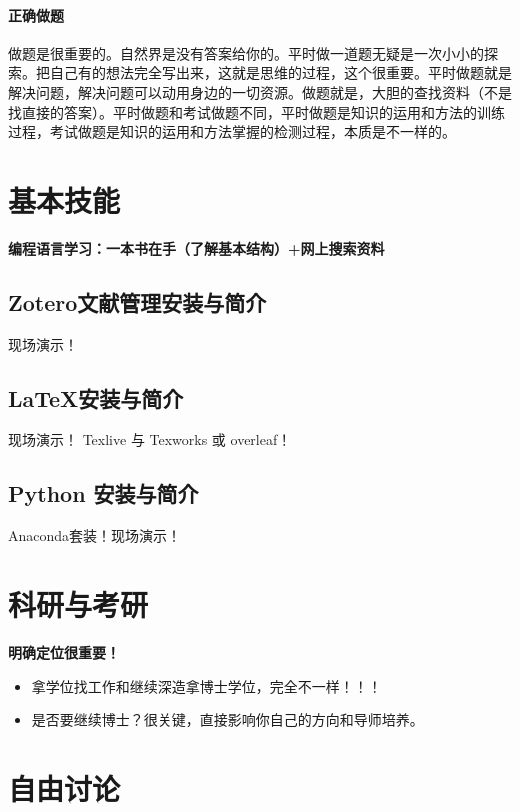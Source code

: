 \documentclass[cn,hazy,blue,14pt,screen]{elegantnote}
\begin{document}
\paragraph{正确做题}
做题是很重要的。自然界是没有答案给你的。平时做一道题无疑是一次小小的探索。把自己有的想法完全写出来，这就是思维的过程，这个很重要。平时做题就是解决问题，解决问题可以动用身边的一切资源。做题就是，大胆的查找资料（不是找直接的答案）。平时做题和考试做题不同，平时做题是知识的运用和方法的训练过程，考试做题是知识的运用和方法掌握的检测过程，本质是不一样的。



\newpage
\section{基本技能}
{\bf 编程语言学习：一本书在手（了解基本结构）+网上搜索资料}

\subsection{Zotero文献管理安装与简介}
现场演示！

\newpage
\subsection{\LaTeX 安装与简介}
现场演示！ Texlive 与 Texworks 或 overleaf！

\newpage
\subsection{Python 安装与简介}
Anaconda套装！现场演示！


\newpage
\section{科研与考研}
{\bf 明确定位很重要！}
\begin{itemize}
\item 拿学位找工作和继续深造拿博士学位，完全不一样！！！

\item 是否要继续博士？很关键，直接影响你自己的方向和导师培养。
\end{itemize}


\newpage
\section{自由讨论}
\end{document}
